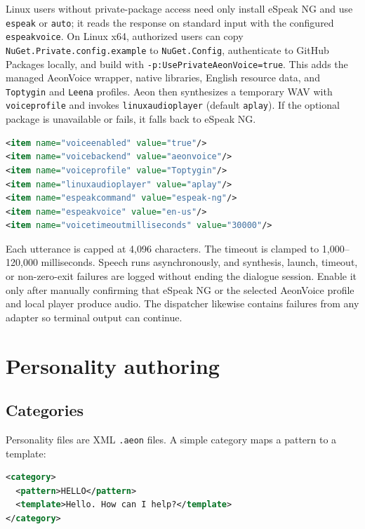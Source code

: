 \documentclass[11pt,a4paper]{article}
\begin{document}
Linux users without private-package access need only install eSpeak NG and use \texttt{espeak} or \texttt{auto}; it reads the response on standard input with the configured \texttt{espeakvoice}. On Linux x64, authorized users can copy \texttt{NuGet.Private.config.example} to \texttt{NuGet.Config}, authenticate to GitHub Packages locally, and build with \texttt{-p:UsePrivateAeonVoice=true}. This adds the managed AeonVoice wrapper, native libraries, English resource data, and \texttt{Toptygin} and \texttt{Leena} profiles. Aeon then synthesizes a temporary WAV with \texttt{voiceprofile} and invokes \texttt{linuxaudioplayer} (default \texttt{aplay}). If the optional package is unavailable or fails, it falls back to eSpeak NG.

\begin{minipage}{\linewidth}
\begin{lstlisting}[language=XML]
<item name="voiceenabled" value="true"/>
<item name="voicebackend" value="aeonvoice"/>
<item name="voiceprofile" value="Toptygin"/>
<item name="linuxaudioplayer" value="aplay"/>
<item name="espeakcommand" value="espeak-ng"/>
<item name="espeakvoice" value="en-us"/>
<item name="voicetimeoutmilliseconds" value="30000"/>
\end{lstlisting}
\end{minipage}

Each utterance is capped at 4,096 characters. The timeout is clamped to 1,000--120,000 milliseconds. Speech runs asynchronously, and synthesis, launch, timeout, or non-zero-exit failures are logged without ending the dialogue session. Enable it only after manually confirming that eSpeak NG or the selected AeonVoice profile and local player produce audio. The dispatcher likewise contains failures from any adapter so terminal output can continue.

\section{Personality authoring}

\subsection{Categories}

Personality files are XML \texttt{.aeon} files. A simple category maps a pattern to a template:

\begin{minipage}{\linewidth}
\begin{lstlisting}[language=XML]
<category>
  <pattern>HELLO</pattern>
  <template>Hello. How can I help?</template>
</category>
\end{lstlisting}
\end{minipage}
\end{document}
